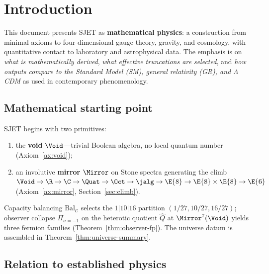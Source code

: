 \section{Introduction}
\label{sec:intro}

This document presents SJET as \textbf{mathematical physics}: a construction
from minimal axioms to four-dimensional gauge theory, gravity, and cosmology,
with quantitative contact to laboratory and astrophysical data. The emphasis is
on \emph{what is mathematically derived}, \emph{what effective truncations are
selected}, and \emph{how outputs compare to the Standard Model (SM),
general relativity (GR), and $\Lambda$CDM} as used in contemporary phenomenology.

\subsection{Mathematical starting point}

SJET begins with two primitives:
\begin{enumerate}[label=(\roman*),leftmargin=*]
  \item the \textbf{void} $\Void$---trivial Boolean algebra, no local quantum
    number (Axiom~\ref{ax:void});
  \item an involutive \textbf{mirror} $\Mirror$ on Stone spectra generating the
    climb $\Void\to\R\to\C\to\Quat\to\Oct\to\jalg\to\E{8}\to\E{8}\times\E{8}\to\E{6}$
    (Axiom~\ref{ax:mirror}, Section~\ref{sec:climb}).
\end{enumerate}
Capacity balancing $\mathrm{Bal}_{\mathcal{C}}$ selects the $1|10|16$ partition
$(1/27,10/27,16/27)$; observer collapse $\Pi_{\sigma=-1}$ on the heterotic
quotient $\hat Q$ at $\Mirror^7(\Void)$ yields three fermion families
(Theorem~\ref{thm:observer-fp}). The universe datum is assembled in
Theorem~\ref{thm:universe-summary}.

\subsection{Relation to established physics}

